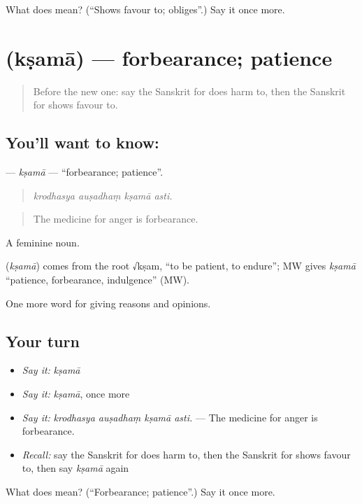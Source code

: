 \begin{tcolorbox}[breakable,colback=teal!4,colframe=teal!35!black,title={Before you move on}]
What does  mean? (\textquotedblleft{}Shows favour to; obliges\textquotedblright{}.) Say it once more.
\end{tcolorbox}
\section[\texorpdfstring{\sk{क्षमा} (kṣamā)}{क्षमा (kṣamā)}]{ (kṣamā) — forbearance; patience}

\label{lesson:SA-C352-ksama}



\begin{quote}
Before the new one: say the Sanskrit for does harm to, then the Sanskrit for shows favour to.
\end{quote}

\subsection*{You'll want to know: }
\textbf{} — \emph{kṣamā} — \textquotedblleft{}forbearance; patience\textquotedblright{}.

\begin{quote}
   
\end{quote}

\begin{quote}
\emph{krodhasya auṣadhaṃ kṣamā asti.}
\end{quote}

\begin{quote}
The medicine for anger is forbearance.
\end{quote}

A feminine noun.

\begin{cousinweb}
\textbf{} (\emph{kṣamā}) comes from the root √kṣam, \textquotedblleft{}to be patient, to endure\textquotedblright{}; MW gives \emph{kṣamā} \textquotedblleft{}patience, forbearance, indulgence\textquotedblright{} (MW).
\end{cousinweb}

\begin{grammarlens}[title={What you've built}]
One more word for giving reasons and opinions.
\end{grammarlens}

\subsection*{Your turn}
\begin{itemize}
\raggedright
  \item \emph{Say it:} \emph{kṣamā}
  \item \emph{Say it:} \emph{kṣamā}, once more
  \item \emph{Say it:} \emph{krodhasya auṣadhaṃ kṣamā asti.} — The medicine for anger is forbearance.
  \item \emph{Recall:} say the Sanskrit for does harm to, then the Sanskrit for shows favour to, then say \emph{kṣamā} again
\end{itemize}

\begin{tcolorbox}[breakable,colback=teal!4,colframe=teal!35!black,title={Before you move on}]
What does  mean? (\textquotedblleft{}Forbearance; patience\textquotedblright{}.) Say it once more.
\end{tcolorbox}
